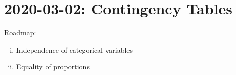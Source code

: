 \section{2020-03-02: Contingency Tables}
\underline{Roadmap}:
\begin{enumerate}[(i)]
    \item Independence of categorical variables
    \item Equality of proportions
\end{enumerate}
